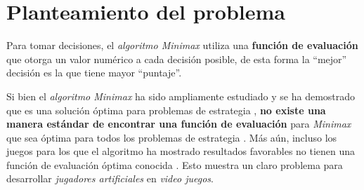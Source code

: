 \section{Planteamiento del problema}
  Para tomar decisiones, el \textit{algoritmo Minimax} utiliza una \textbf{función de evaluación} 
  que otorga un valor numérico a cada decisión posible, de esta forma la \enquote{mejor} decisión es 
  la que tiene mayor \enquote{puntaje}.

  Si bien el \textit{algoritmo Minimax} ha sido ampliamente estudiado y se ha demostrado que es una
  solución óptima para problemas de estrategia 
  \cite{v.neumannZurTheorieGesellschaftsspiele1928,fanMinimaxTheorems1953}, \textbf{no existe una 
  manera estándar de encontrar una función de evaluación} para \textit{Minimax} que sea óptima para 
  todos los problemas de estrategia \cite{dyerCS540Lecture}.
  Más aún, incluso los juegos para los que el algoritmo ha mostrado resultados favorables no tienen
  una función de evaluación óptima conocida \cite{shannonProgrammingComputerPlaying1988}.
  Esto muestra un claro problema para desarrollar \textit{jugadores artificiales} en \textit{video 
  juegos}.